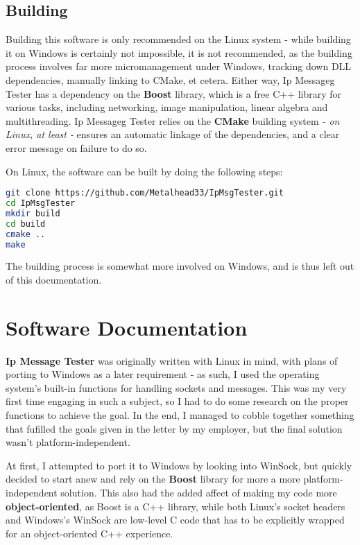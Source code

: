 \documentclass[openany,10pt,a4paper]{book}
\begin{document}
\subsection{Building}
Building this software is only recommended on the Linux system - while building it on Windows is certainly not impossible, it is not recommended, as the building process involves far more micromanagement under Windows, tracking down DLL dependencies, manually linking to CMake, et cetera. Either way, Ip Messageg Tester has a dependency on the \textbf{Boost} library, which is a free C++ library for various tasks, including networking, image manipulation, linear algebra and multithreading. Ip Messageg Tester relies on the \textbf{CMake} building system \textit{- on Linux, at least -} ensures an automatic linkage of the dependencies, and a clear error message on failure to do so.

On Linux, the software can be built by doing the following steps:

\begin{lstlisting}[language=bash]
git clone https://github.com/Metalhead33/IpMsgTester.git
cd IpMsgTester
mkdir build
cd build
cmake ..
make
\end{lstlisting}

The building process is somewhat more involved on Windows, and is thus left out of this documentation.
\section{Software Documentation}
\textbf{Ip Message Tester} was originally written with Linux in mind, with plans of porting to Windows as a later requirement - as such, I used the operating system's built-in functions for handling sockets and messages. This was my very first time engaging in such a subject, so I had to do some research on the proper functions to achieve the goal. In the end, I managed to cobble together something that fufilled the goals given in the letter by my employer, but the final solution wasn't platform-independent.

At first, I attempted to port it to Windows by looking into WinSock, but quickly decided to start anew and rely on the \textbf{Boost} library for more a more platform-independent solution. This also had the added affect of making my code more \textbf{object-oriented}, as Boost is a C++ library, while both Linux's socket headers and Windows's WinSock are low-level C code that has to be explicitly wrapped for an object-oriented C++ experience.
\end{document}
